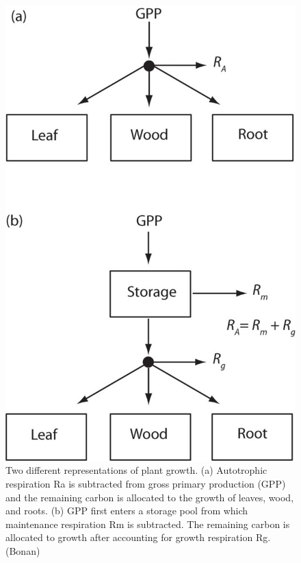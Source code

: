 \documentclass[12pt,oneside]{book}
\begin{document}
\begin{figure}

{\centering \includegraphics[width=0.8\linewidth]{figures/chap5/f59_storage_pool} 

}

\caption{Two different representations of plant growth. (a) Autotrophic respiration Ra is subtracted from gross primary production (GPP) and the remaining carbon is allocated to the growth of leaves, wood, and roots. (b) GPP first enters a storage pool from which maintenance respiration Rm is subtracted. The remaining carbon is allocated to growth after accounting for growth respiration Rg.(Bonan)}\label{fig:f59}
\end{figure}
\end{document}
